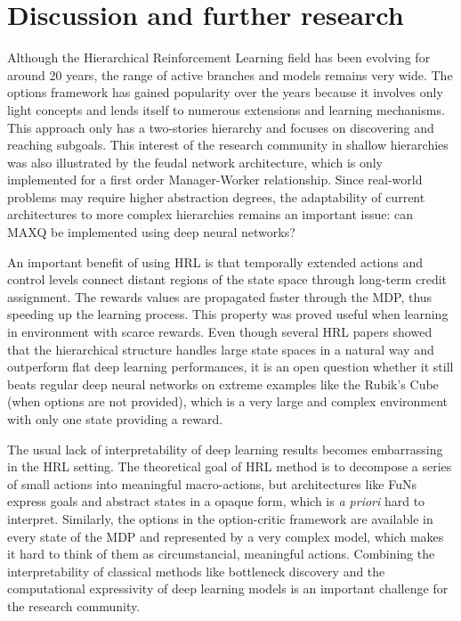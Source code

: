 \documentclass{article}
\begin{document}
\section{Discussion and further research}

Although the Hierarchical Reinforcement Learning field has been evolving for around 20 years, the range of active branches and models remains very wide. The options framework has gained popularity over the years because it involves only light concepts and lends itself to numerous extensions and learning mechanisms. This approach only has a two-stories hierarchy and focuses on discovering and reaching subgoals. This interest of the research community in shallow hierarchies was also illustrated by the feudal network architecture, which is only implemented for a first order Manager-Worker relationship. Since real-world problems may require higher abstraction degrees, the adaptability of current architectures to more complex hierarchies remains an important issue: can MAXQ be implemented using deep neural networks?

An important benefit of using HRL is that temporally extended actions and control levels connect distant regions of the state space through long-term credit assignment. The rewards values are propagated faster through the MDP, thus speeding up the learning process. This property was proved useful when learning in environment with scarce rewards. Even though several HRL papers showed that the hierarchical structure handles large state spaces in a natural way and outperform flat deep learning performances, it is an open question whether it still beats regular deep neural networks on extreme examples like the Rubik's Cube (when options are not provided), which is a very large and complex environment with only one state providing a reward.

The usual lack of interpretability of deep learning results becomes embarrassing in the HRL setting. The theoretical goal of HRL method is to decompose a series of small actions into meaningful macro-actions, but architectures like FuNs express goals and abstract states in a opaque form, which is \textit{a priori} hard to interpret. Similarly, the options in the option-critic framework are available in every state of the MDP and represented by a very complex model, which makes it hard to think of them as circumstancial, meaningful actions. Combining the interpretability of classical methods like bottleneck discovery and the computational expressivity of deep learning models is an important challenge for the research community.
\end{document}

